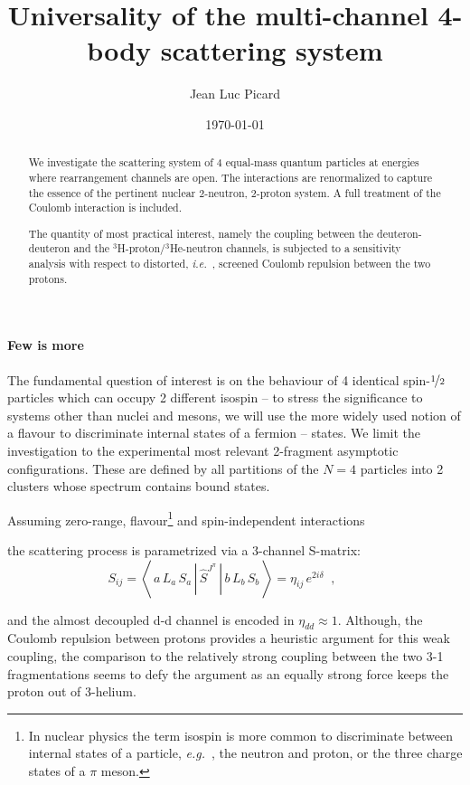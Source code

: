 \documentclass[onecolumn,preprint,superscriptaddress,nofootinbib,notitlepage,10pt,linenumbers]{revtex4-1}
\newcommand{\eg}{\textit{e.g.}~}
\newcommand{\ie}{\textit{i.e.}~}
\newcommand{\be}{\begin{equation}}
\newcommand{\ee}{\end{equation}}
\newcommand{\la}{\label}
\newcommand{\me}[3] {\left\langle\,#1\,\left|\left.\,#2\,\right|\,#3\,\right.\right\rangle}
\begin{document}
\title{Universality of the multi-channel 4-body scattering system}
\author{Jean Luc Picard}
\date{\today}

\begin{abstract}
We investigate the scattering system of 4 equal-mass quantum particles at energies
where rearrangement channels are open. The interactions are renormalized to capture
the essence of the pertinent nuclear 2-neutron, 2-proton system. A full
treatment of the Coulomb interaction is included.

The quantity of most practical interest, namely the coupling between the deuteron-deuteron
and the ${}^3$H-proton/${}^3$He-neutron channels, is subjected to a sensitivity analysis
with respect to distorted, \ie, screened Coulomb repulsion between the two protons.
\end{abstract}

\maketitle

\paragraph{Few is more}

The fundamental question of interest is on the behaviour of 4
identical spin-$\nicefrac{1}{2}$ particles which can occupy 2
different isospin -- to stress the significance to systems other than
nuclei and mesons, we will use the more widely used notion of a flavour to discriminate
internal states of a fermion -- states.
We limit the investigation to the experimental most relevant 2-fragment
asymptotic configurations. These are defined by all partitions of the
$N=4$ particles into 2 clusters whose spectrum contains bound states.



Assuming zero-range, flavour\footnote{In nuclear physics the term 
isospin is more common to discriminate between internal states of a particle,
\eg, the neutron and proton, or the three charge states of a $\pi$ meson.} 
and spin-independent interactions 

the scattering process is parametrized via a 3-channel S-matrix:
\be
\la{eq.sm}
S_{ij}=\me{a\,L_a\,S_a}{\hat{S}^{J^\pi}}{b\,L_b\,S_b}=\eta_{ij}\,e^{2i\delta}
\;\;,\qquad
\ee

and the almost decoupled d-d channel is encoded in $\eta_{dd}\approx 1$. Although, the Coulomb repulsion between protons
provides a heuristic argument for this weak coupling, the comparison to the relatively strong coupling between the two 3-1
fragmentations seems to defy the argument as an equally strong force keeps the proton out of 3-helium.
\end{document}

